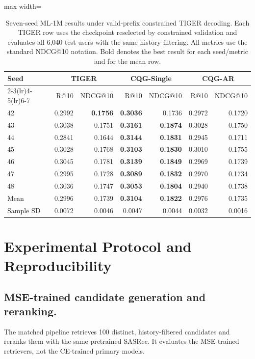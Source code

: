 \documentclass[preprint,12pt]{elsarticle}
\begin{document}
\begin{table}[htbp]
\centering
\small
\setlength{\tabcolsep}{5pt}
\begin{adjustbox}{max width=\linewidth}
\begin{tabular}{lrrrrrr}
\toprule
Seed & \multicolumn{2}{c}{TIGER} & \multicolumn{2}{c}{CQG-Single} &
\multicolumn{2}{c}{CQG-AR} \\
\cmidrule(lr){2-3}\cmidrule(lr){4-5}\cmidrule(lr){6-7}
& R@10 & NDCG@10 & R@10 & NDCG@10 & R@10 & NDCG@10 \\
\midrule
42 & 0.2992 & \textbf{0.1756} & \textbf{0.3036} & 0.1736 & 0.2972 & 0.1720 \\
43 & 0.3038 & 0.1751 & \textbf{0.3161} & \textbf{0.1874} & 0.3028 & 0.1750 \\
44 & 0.2841 & 0.1644 & \textbf{0.3144} & \textbf{0.1831} & 0.2945 & 0.1711 \\
45 & 0.3028 & 0.1768 & \textbf{0.3103} & \textbf{0.1830} & 0.3010 & 0.1755 \\
46 & 0.3045 & 0.1781 & \textbf{0.3139} & \textbf{0.1849} & 0.2969 & 0.1739 \\
47 & 0.2995 & 0.1728 & \textbf{0.3089} & \textbf{0.1832} & 0.2970 & 0.1734 \\
48 & 0.3036 & 0.1747 & \textbf{0.3053} & \textbf{0.1804} & 0.2940 & 0.1738 \\
\midrule
Mean & 0.2996 & 0.1739 & \textbf{0.3104} & \textbf{0.1822} & 0.2976 & 0.1735 \\
Sample SD & 0.0072 & 0.0046 & 0.0047 & 0.0044 & 0.0032 & 0.0016 \\
\bottomrule
\end{tabular}
\end{adjustbox}
\caption{Seven-seed ML-1M results under valid-prefix constrained TIGER
decoding. Each TIGER row uses the checkpoint reselected by constrained
validation and evaluates all 6,040 test users with the same history filtering.
All metrics use the standard NDCG@10 notation. Bold denotes the best result
for each seed/metric and for the mean row.}
\label{tab:ml1m-seven-seed}
\end{table}


\section{Experimental Protocol and Reproducibility}
\label{app:protocol}


\subsection{MSE-trained candidate generation and reranking.}
\label{app:mse-rerank}
The matched pipeline retrieves 100 distinct, history-filtered candidates and
reranks them with the same pretrained SASRec. It evaluates the MSE-trained
retrievers, not the CE-trained primary models.
\end{document}
